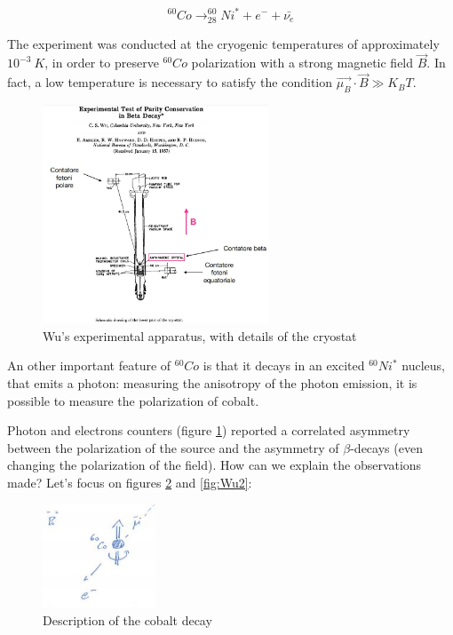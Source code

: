 \[ ^{60}Co \rightarrow _{28}^{60}Ni^* + e^- +\bar{\nu_e}\]

The experiment was conducted at the cryogenic temperatures of approximately $10^{-3} \ K$, in order to preserve $^{60}Co$ polarization with a strong magnetic field $\vec{B}$.
In fact, a low temperature is necessary to satisfy the condition $\vec{\mu_B}\cdot \vec{B} \gg K_BT$. 

\begin{figure}[!h]
    \centering
    \includegraphics[width=0.6\textwidth]{Figures/FNSN31_1.JPG}
    
    \caption{Wu's experimental apparatus, with details of the cryostat}
    \label{fig:Wusetting1}
\end{figure} 

An other important feature of $^{60}Co$ is that it decays in an excited $^{60}Ni^*$ nucleus, that emits a photon: measuring the anisotropy of the photon emission, it is possible to measure the polarization of cobalt.

Photon and electrons counters (figure \ref{fig:Wusetting1}) reported a correlated asymmetry between the polarization of the source and the asymmetry of $\beta$-decays (even changing the polarization of the field). 
How can we explain the observations made?
Let's focus on figures \ref{fig:Wu1} and \ref{fig:Wu2}:

\begin{figure}[!h]
    \centering
    \includegraphics[width=0.3\textwidth]{Figures/FNSN31_2.JPG}
    \caption{Description of the cobalt decay}
    \label{fig:Wu1}
\end{figure} 


